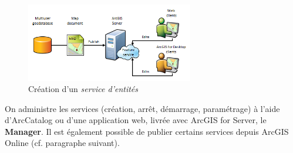 \documentclass[11pt]{article}
\begin{document}
\begin{figure}[H]
	\center \includegraphics[width=0.65\textwidth]{img/cours/publication_feature_service.png}
	\caption{Création d'un \textit{service d'entités}}
\end{figure}

On administre les services (création, arrêt, démarrage, paramétrage) à l’aide  d’ArcCatalog ou d’une application web, livrée avec ArcGIS for Server, le \textbf{Manager}. Il est également possible de publier certains services depuis ArcGIS Online (cf. paragraphe suivant).
\end{document}
